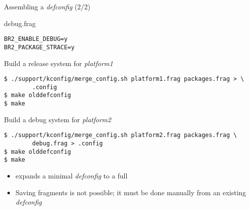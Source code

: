 \begin{frame}[fragile]{Assembling a {\em defconfig} (2/2)}

  \begin{block}{debug.frag}
    {\scriptsize
\begin{verbatim}
BR2_ENABLE_DEBUG=y
BR2_PACKAGE_STRACE=y
\end{verbatim}
    }
  \end{block}

  \begin{block}{Build a release system for {\em platform1}}
    {\scriptsize
\begin{verbatim}
$ ./support/kconfig/merge_config.sh platform1.frag packages.frag > \
        .config
$ make olddefconfig
$ make
\end{verbatim}
    }
  \end{block}

  \begin{block}{Build a debug system for {\em platform2}}
    {\scriptsize
\begin{verbatim}
$ ./support/kconfig/merge_config.sh platform2.frag packages.frag \
        debug.frag > .config
$ make olddefconfig
$ make
\end{verbatim}
    }
  \end{block}

  \begin{itemize}
  \item {} expands a minimal {\em defconfig} to a
    full 
  \item Saving fragments is not possible; it must be done manually
    from an existing {\em defconfig}
  \end{itemize}

\end{frame}

